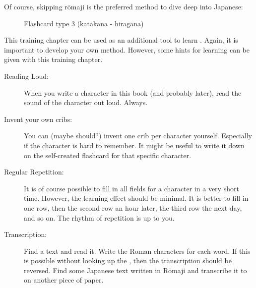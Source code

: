\normalsize

Of course, skipping rōmaji is the preferred method to dive deep into Japanese:

\begin{figure}[H]
        
        \caption{Flashcard type 3 (katakana - hiragana)}
        \label{fig:FlashCardTypeThree}
\end{figure}

This training chapter can be used as an additional tool to learn
\textbf{\jtopic}. Again, it is important to develop your own method. However,
some hints for learning can be given with this training chapter.

\begin{description}

\item[Reading Loud:] When you write a \textbf{\jtopic} character in this book
        (and probably later), read the sound of the character out loud. Always.

\item[Invent your own cribs:] You can (maybe should?) invent one crib per
        character yourself. Especially if the character is hard to remember. It
        might be useful to write it down on the self-created flashcard for that
        specific character.

\item[Regular Repetition:] It is of course possible to fill in all fields for a
        character in a very short time. However, the learning effect should be
        minimal. It is better to fill in one row, then the second row an hour
        later, the third row the next day, and so on. The rhythm of repetition
        is up to you.

\item[Transcription:] Find a \textbf{\jtopic} text and read it. Write the Roman
        characters for each \jtopic word. If this is possible without looking
        up the \jtopic, then the transcription should be reversed. Find some
        Japanese text written in Rōmaji and transcribe it to \jtopic on another
        piece of paper.

\end{description}

\newpage


